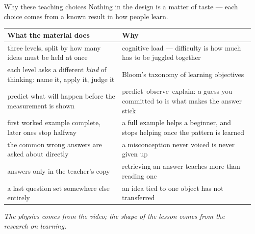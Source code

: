 \documentclass[aspectratio=169,11pt]{beamer}
\newcommand{\takeaway}[1]{\vfill{\small\itshape\color{cGrey}#1\par}}
\begin{document}
\begin{frame}{Why these teaching choices}
\vspace{-1pt}
{\scriptsize Nothing in the design is a matter of taste --- each choice comes from a known result
in how people learn.}
\vspace{2pt}

\scriptsize
\renewcommand{\arraystretch}{1.16}
\begin{center}
\begin{tabular}{@{}p{6.1cm}p{6.4cm}@{}}
\toprule
\rowcolor{cPed!12}
\textbf{What the material does} & \textbf{Why} \\
\midrule
three levels, split by how many ideas must be held at once &
cognitive load --- difficulty is how much has to be juggled together \\
each level asks a different \emph{kind} of thinking: name it, apply it, judge it &
Bloom's taxonomy of learning objectives \\
predict what will happen before the measurement is shown &
predict--observe--explain: a guess you committed to is what makes the answer stick \\
first worked example complete, later ones stop halfway &
a full example helps a beginner, and stops helping once the pattern is learned \\
the common wrong answers are asked about directly &
a misconception never voiced is never given up \\
answers only in the teacher's copy &
retrieving an answer teaches more than reading one \\
a last question set somewhere else entirely &
an idea tied to one object has not transferred \\
\bottomrule
\end{tabular}
\end{center}
\takeaway{The physics comes from the video; the shape of the lesson comes from the research on
learning.}
\end{frame}
\end{document}
